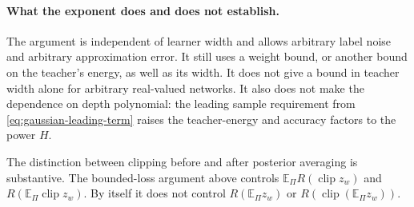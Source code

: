 \paragraph{What the exponent does and does not establish.}
The argument is independent of learner width and allows arbitrary
label noise and arbitrary approximation error.  It still uses a weight
bound, or another bound on the teacher's energy, as well as its width.
It does not give a bound in teacher width alone for arbitrary
real-valued networks.  It also does not make the dependence on depth
polynomial: the leading sample requirement from
\eqref{eq:gaussian-leading-term} raises the teacher-energy and accuracy
factors to the power $H$.

The distinction between clipping before and after posterior averaging
is substantive.  The bounded-loss argument above controls
$\mathbb E_\Pi R(\operatorname{clip}z_w)$ and
$R(\mathbb E_\Pi\operatorname{clip}z_w)$.  By itself it does not control
$R(\mathbb E_\Pi z_w)$ or
$R(\operatorname{clip}(\mathbb E_\Pi z_w))$.
